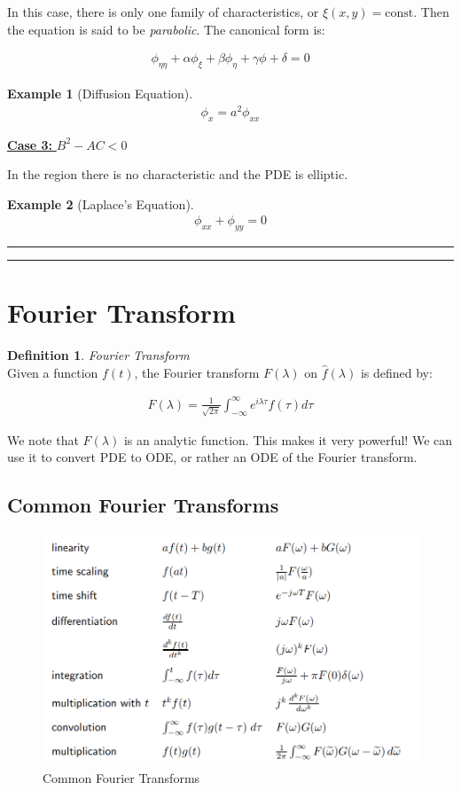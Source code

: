 \documentclass{article}
\newtheorem{ex}{Example}
\theoremstyle{definition}
\newtheorem{definition}{Definition}[section]
\newcommand{\Section}[1]{\hrule\hrule\section{#1}}
\newcommand{\Def}[2]{
\begin{shaded*}
\begin{definition}{\textit{#1}}\\#2\end{definition}
\end{shaded*}
}
\begin{document}
In this case, there is only one family of characteristics, or $\xi(x,y) = \text{const}$. Then the equation is said to be \textit{parabolic}. The canonical form is:

\begin{align*}
\phi_{\eta \eta} + \alpha \phi_\xi + \beta \phi_\eta + \gamma \phi + \delta = 0
\end{align*}

\begin{ex}[Diffusion Equation]

\begin{align*}
\phi_x = a^2 \phi_{xx}
\end{align*}
\end{ex}

\underline{\textbf{Case 3:} $B^2-AC < 0$}

In the region there is no characteristic and the PDE is elliptic.

\begin{ex}[Laplace's Equation]
\begin{align*}
\phi_{xx} + \phi_{yy} = 0
\end{align*}
\end{ex}

\Section{Fourier Transform }

\Def{Fourier Transform}{Given a function $f(t)$, the Fourier transform $F(\lambda)$ on $\hat{f}(\lambda)$ is defined by:

\begin{align*}
F(\lambda) = \frac{1}{\sqrt{2\pi}} \int_{-\infty}^{\infty} e^{i \lambda \tau} f(\tau) d\tau
\end{align*}

We note that $F(\lambda)$ is an analytic function. This makes it very powerful! We can use it to convert PDE to ODE, or rather an ODE of the Fourier transform.
}

\subsection{Common Fourier Transforms}
\begin{figure}[H]
	\centering
	\includegraphics[width=0.7\linewidth]{common_fourier}
	\caption{Common Fourier Transforms}
	\label{fig:commonfourier}
\end{figure}
\end{document}
